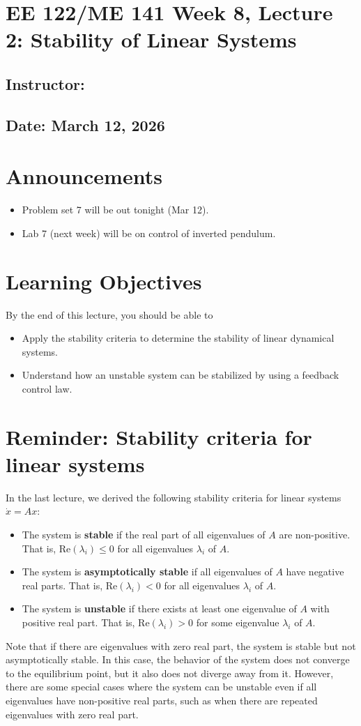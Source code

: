 \documentclass{ee122_notes}
\renewcommand{\releasedate}{March 12, 2026}
\begin{document}
\section*{EE 122/ME 141 Week 8, Lecture 2: Stability of Linear Systems}
\subsection*{Instructor: \instructor}
\subsection*{Date: \releasedate}
\section{Announcements}
\begin{itemize}
    \item Problem set 7 will be out tonight (Mar 12). 
    \item Lab 7 (next week) will be on control of inverted pendulum.
\end{itemize}
\section{Learning Objectives}
By the end of this lecture, you should be able to 
\begin{itemize}
\item Apply the stability criteria to determine the stability of linear dynamical systems.
\item Understand how an unstable system can be stabilized by using a feedback control law.
\end{itemize}

\section{Reminder: Stability criteria for linear systems}
In the last lecture, we derived the following stability criteria for linear systems $\dot{x} = Ax$:
\begin{itemize}
    \item The system is \textbf{stable} if the real part of all eigenvalues of $A$ are non-positive. That is, $\text{Re}(\lambda_i) \leq 0$ for all eigenvalues $\lambda_i$ of $A$. 
    \item The system is \textbf{asymptotically stable} if all eigenvalues of $A$ have negative real parts. That is, $\text{Re}(\lambda_i) < 0$ for all eigenvalues $\lambda_i$ of $A$.
    \item The system is \textbf{unstable} if there exists at least one eigenvalue of $A$ with positive real part. That is, $\text{Re}(\lambda_i) > 0$ for some eigenvalue $\lambda_i$ of $A$.
\end{itemize}
Note that if there are eigenvalues with zero real part, the system is stable but not asymptotically stable. In this case, the behavior of the system does not converge to the equilibrium point, but it also does not diverge away from it. However, there are some special cases where the system can be unstable even if all eigenvalues have non-positive real parts, such as when there are repeated eigenvalues with zero real part. 
\end{document}
